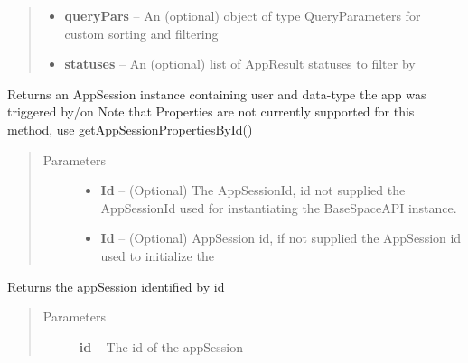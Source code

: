 \documentclass[letterpaper,10pt,english]{sphinxmanual}
\begin{document}
\begin{fulllineitems}
\begin{fulllineitems}
\begin{quote}
\begin{description}
\begin{itemize}
\item {} 
\textbf{queryPars} -- An (optional) object of type QueryParameters for custom sorting and filtering

\item {} 
\textbf{statuses} -- An (optional) list of AppResult statuses to filter by

\end{itemize}

\end{description}\end{quote}

\end{fulllineitems}


\begin{fulllineitems}
\label{Available modules:BaseSpacePy.api.BaseSpaceAPI.BaseSpaceAPI.getAppSession}
Returns an AppSession instance containing user and data-type the app was triggered by/on
Note that Properties are not currently supported for this method, use getAppSessionPropertiesById()
\begin{quote}\begin{description}
\item[{Parameters}] \leavevmode\begin{itemize}
\item {} 
\textbf{Id} -- (Optional) The AppSessionId, id not supplied the AppSessionId used for instantiating the BaseSpaceAPI instance.

\item {} 
\textbf{Id} -- (Optional) AppSession id, if not supplied the AppSession id used to initialize the

\end{itemize}

\end{description}\end{quote}

\end{fulllineitems}


\begin{fulllineitems}
\label{Available modules:BaseSpacePy.api.BaseSpaceAPI.BaseSpaceAPI.getAppSessionById}
Returns the appSession identified by id
\begin{quote}\begin{description}
\item[{Parameters}] \leavevmode
\textbf{id} -- The id of the appSession


\end{description}
\end{quote}
\end{fulllineitems}
\end{fulllineitems}
\end{document}
